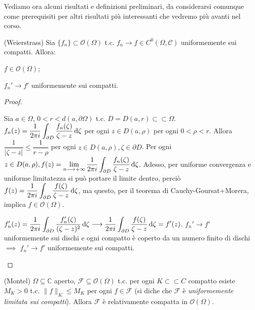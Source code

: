Vediamo ora alcuni risultati e definizioni preliminari, da considerarsi comunque come prerequisiti per altri risultati più interessanti che vedremo più avanti nel corso.

\begin{thm}
  (Weierstrass) Sia $\{f_n\} \subset \mathcal{O}(\Omega)$ t.c. $f_n \longrightarrow f \in C^0(\Omega, \mathcal{C})$ uniformemente sui compatti. Allora:
  \begin{nlist}
    \item $f \in \mathcal{O}(\Omega)$;
    \item $f_n' \longrightarrow f'$ uniformemente sui compatti.
  \end{nlist}
\end{thm}

\begin{proof}
  \begin{nlist}
    \item Sia $a \in \Omega$, $0<r<d(a, \partial\Omega)$ t.c. $D=D(a, r) \subset \subset \Omega$. $\displaystyle f_n(z)=\frac{1}{2\pi i} \int_{\partial D} \frac{f_n(\zeta)}{\zeta-z} \mathop{}\!\mathrm{d} \zeta$ per ogni $z \in D(a, \rho)$ per ogni $0<\rho<r$.
    Allora $\dfrac{1}{|\zeta-z|} \le \dfrac{1}{r-\rho}$ per ogni $z \in D(a, \rho), \zeta \in \partial{D}$.
    Per ogni $\displaystyle z \in D(a, \rho), f(z)=\lim_{n \longrightarrow +\infty} \frac{1}{2\pi i} \int_{\partial D} \frac{f_n(\zeta)}{\zeta-z} \mathop{}\!\mathrm{d} \zeta$.
    Adesso, per uniforme convergenza e uniforme limitatezza si può portare il limite dentro, perciò $\displaystyle f(z)=\frac{1}{2\pi i}\int_{\partial D} \frac{f(\zeta)}{\zeta-z} \mathop{}\!\mathrm{d} \zeta$, ma questo, per il teorema di Cauchy-Goursat+Morera, implica $f \in \mathcal{O}(\Omega)$.
    \item $\displaystyle f_n'(z)=\frac{1}{2\pi i} \int_{\partial D} \frac{f_n'(\zeta)}{(\zeta-z)^2}\mathop{}\!\mathrm{d}\zeta \longrightarrow \frac{1}{2\pi i} \int_{\partial D} \frac{f(\zeta)}{\zeta-z} \mathop{}\!\mathrm{d}\zeta=f'(z)$.
    $f_n' \longrightarrow f'$ uniformemente sui dischi e ogni compatto è coperto da un numero finito di dischi $\implies$ $f_n' \longrightarrow f'$ uniformemente sui compatti.
  \end{nlist}
\end{proof}

\begin{thm}
  (Montel) $\Omega \subseteq \mathbb{C}$ aperto, $\mathcal{F} \subseteq \mathcal{O}(\Omega)$ t.c. per ogni $K \subset \subset C$ compatto esiste $M_K>0$ t.c. $\|f\|_K \le M_K$ per ogni $f \in \mathcal{F}$ (si diche che $\mathcal{F}$ è \textit{uniformemente limitata sui compatti}).
  Allora $\mathcal{F}$ è relativamente compatta in $\mathcal{O}(\Omega)$.
\end{thm}

